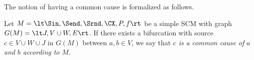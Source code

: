 The notion of having a common cause is formalized as follows.
\begin{Def}\label{def:common_cause_of}
  Let $M = \lt \Sin, \Send, \Srnd, \CX, P, f \rt$ be a simple SCM with graph $G(M) = \lt J, V \cup W, E \rt$.
    If there exists a bifurcation with source $c \in V \cup W \cup J$ in $G(M)$ between $a,b \in V$, we say that \emph{$c$ is a common cause of $a$ and $b$ according to $M$}.
\end{Def}
